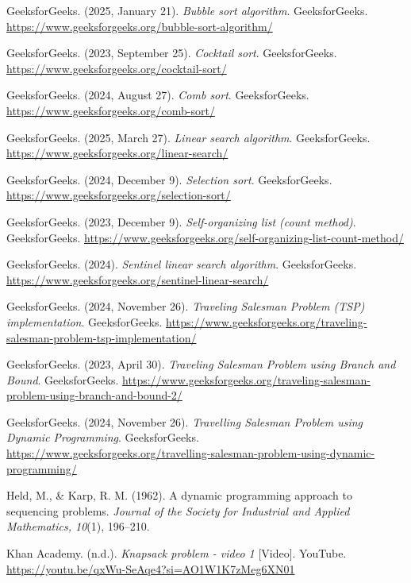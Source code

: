 \documentclass{article}
\begin{document}
\clearpage
\begin{thebibliography}{}

 GeeksforGeeks. (2025, January 21). \textit{Bubble sort algorithm}. GeeksforGeeks. \url{https://www.geeksforgeeks.org/bubble-sort-algorithm/}

 GeeksforGeeks. (2023, September 25). \textit{Cocktail sort}. GeeksforGeeks. \url{https://www.geeksforgeeks.org/cocktail-sort/}

 GeeksforGeeks. (2024, August 27). \textit{Comb sort}. GeeksforGeeks. \url{https://www.geeksforgeeks.org/comb-sort/}

 GeeksforGeeks. (2025, March 27). \textit{Linear search algorithm}. GeeksforGeeks. \url{https://www.geeksforgeeks.org/linear-search/}

 GeeksforGeeks. (2024, December 9). \textit{Selection sort}. GeeksforGeeks. \url{https://www.geeksforgeeks.org/selection-sort/}

 GeeksforGeeks. (2023, December 9). \textit{Self-organizing list (count method)}. GeeksforGeeks. \url{https://www.geeksforgeeks.org/self-organizing-list-count-method/}

 GeeksforGeeks. (2024). \textit{Sentinel linear search algorithm}. GeeksforGeeks. \url{https://www.geeksforgeeks.org/sentinel-linear-search/}

 GeeksforGeeks. (2024, November 26). \textit{Traveling Salesman Problem (TSP) implementation}. GeeksforGeeks. \url{https://www.geeksforgeeks.org/traveling-salesman-problem-tsp-implementation/}

 GeeksforGeeks. (2023, April 30). \textit{Traveling Salesman Problem using Branch and Bound}. GeeksforGeeks. \url{https://www.geeksforgeeks.org/traveling-salesman-problem-using-branch-and-bound-2/}

 GeeksforGeeks. (2024, November 26). \textit{Travelling Salesman Problem using Dynamic Programming}. GeeksforGeeks. \url{https://www.geeksforgeeks.org/travelling-salesman-problem-using-dynamic-programming/}

 Held, M., \& Karp, R. M. (1962). A dynamic programming approach to sequencing problems. \textit{Journal of the Society for Industrial and Applied Mathematics, 10}(1), 196–210.

 Khan Academy. (n.d.). \textit{Knapsack problem - video 1} [Video]. YouTube. \url{https://youtu.be/qxWu-SeAqe4?si=AO1W1K7zMeg6XN01}


\end{thebibliography}
\end{document}
